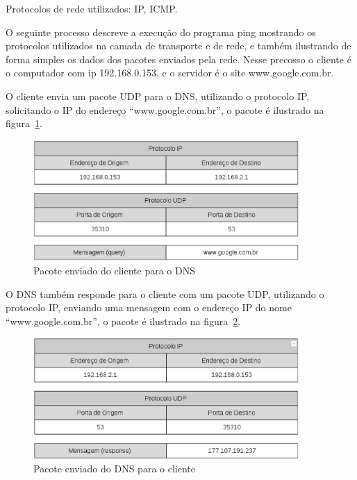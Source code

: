 Protocolos de rede utilizados: IP, ICMP.

O seguinte processo descreve a execução do programa ping mostrando os
protocolos utilizados na camada de transporte e de rede, e também
ilustrando de forma simples os dados dos pacotes enviados pela rede.
Nesse precosso o cliente é o computador com ip 192.168.0.153, e o
servidor é o site www.google.com.br.

O cliente envia um pacote UDP para o DNS, utilizando o protocolo
IP, solicitando o IP do endereço “www.google.com.br”, o pacote é ilustrado
na figura~\ref{fig:pkg_client_to_dns}.

    \begin{figure}[h]
      \centering
      \includegraphics[width=0.9\textwidth]{figuras/pkg_client_to_dns.eps}
      \caption{Pacote enviado do cliente para o DNS}
      \label{fig:pkg_client_to_dns}
    \end{figure}

O DNS também responde para o cliente com um pacote UDP, utilizando
o protocolo IP, enviando uma mensagem com o endereço IP do nome
“www.google.com.br”, o pacote é ilustrado na figura~\ref{fig:pkg_dns_to_client}.

    \begin{figure}[h]
      \centering
      \includegraphics[width=0.9\textwidth]{figuras/pkg_dns_to_client.eps}
      \caption{Pacote enviado do DNS para o cliente}
      \label{fig:pkg_dns_to_client}
    \end{figure}


